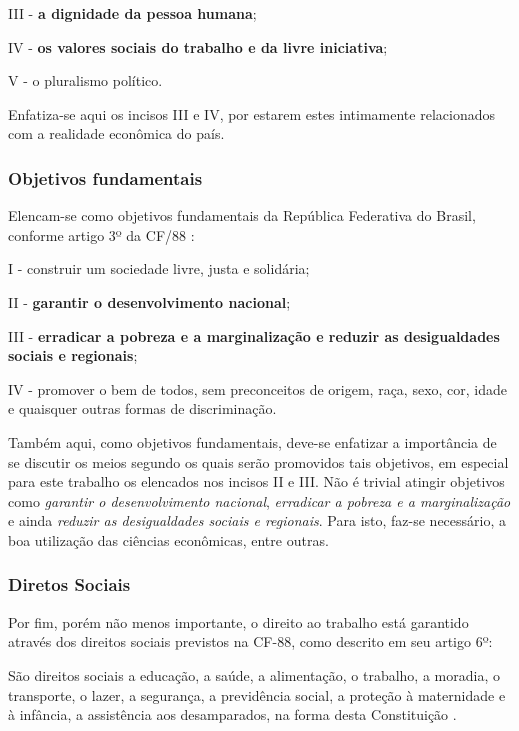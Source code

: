 \documentclass[
	10pt,				%
	openright,			%
	twoside,			%
	a5paper,			%
	english,			%
	french,				%
	spanish,			%
	brazil				%
	]{abntex2}
\renewenvironment{quote}
  {\small\list{}{\rightmargin=0.1cm \leftmargin=4cm}%
   \item\relax}
  {\endlist}
\begin{document}
III - \textbf{a dignidade da pessoa humana};

IV - \textbf{os valores sociais do trabalho e da livre iniciativa};

V - o pluralismo político.

Enfatiza-se aqui os incisos III e IV, por estarem estes intimamente
relacionados com a realidade econômica do país.

\subsubsection{Objetivos fundamentais}\label{objetivos-fundamentais}

Elencam-se como objetivos fundamentais da República Federativa do
Brasil, conforme artigo 3º da CF/88 \cite[grifo nosso]{cf88}:

I - construir um sociedade livre, justa e solidária;

II - \textbf{garantir o desenvolvimento nacional};

III - \textbf{erradicar a pobreza e a marginalização e reduzir as
desigualdades sociais e regionais};

IV - promover o bem de todos, sem preconceitos de origem, raça, sexo,
cor, idade e quaisquer outras formas de discriminação.

Também aqui, como objetivos fundamentais, deve-se enfatizar a
importância de se discutir os meios segundo os quais serão promovidos
tais objetivos, em especial para este trabalho os elencados nos incisos
II e III. Não é trivial atingir objetivos como \emph{garantir o
desenvolvimento nacional}, \emph{erradicar a pobreza e a marginalização}
e ainda \emph{reduzir as desigualdades sociais e regionais}. Para isto,
faz-se necessário, a boa utilização das ciências econômicas, entre
outras.

\subsubsection{Diretos Sociais}\label{diretos-sociais}

Por fim, porém não menos importante, o direito ao trabalho está
garantido através dos direitos sociais previstos na CF-88, como descrito
em seu artigo 6º:

\begin{quote}
São direitos sociais a educação, a saúde, a alimentação, o trabalho, a
moradia, o transporte, o lazer, a segurança, a previdência social, a
proteção à maternidade e à infância, a assistência aos desamparados, na
forma desta Constituição \cite[art.~6º]{cf88}.
\end{quote}
\end{document}
